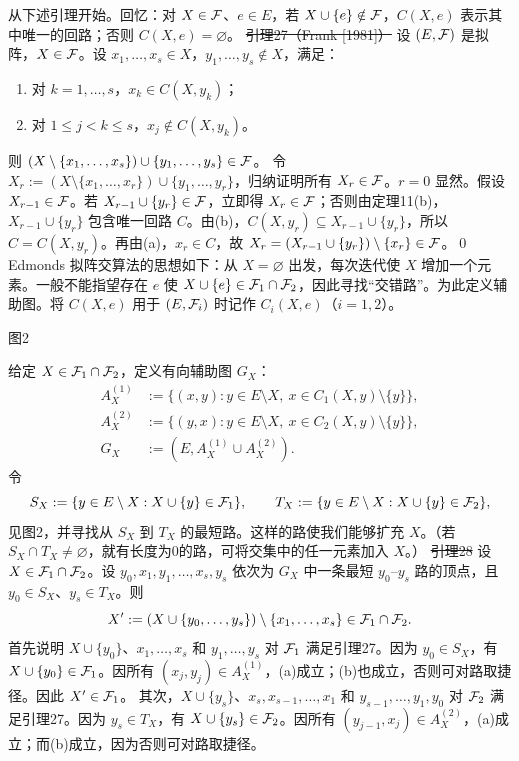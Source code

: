 从下述引理开始。回忆：对 $X\in\mathcal F$、$e\in E$，若 $X\cup\{e\}\notin\mathcal F$，$C(X,e)$ 表示其中唯一的回路；否则 $C(X,e)=\varnothing$。
\st{引理27（Frank [1981]）} 设 $(E,\mathcal F)$ 是拟阵，$X\in\mathcal F$。设 $x_1,\ldots,x_s\in X$，$y_1,\ldots,y_s\notin X$，满足：
\begin{enumerate}[label=(\alph*)]
\item 对 $k=1,\ldots,s$，$x_k\in C(X,y_k)$；
\item 对 $1\le j<k\le s$，$x_j\notin C(X,y_k)$。
\end{enumerate}
则 $(X\setminus\{x_1,\ldots,x_s\})\cup\{y_1,\ldots,y_s\}\in\mathcal F$。
\pr 令 $X_r:=(X\setminus\{x_1,\ldots,x_r\})\cup\{y_1,\ldots,y_r\}$，归纳证明所有 $X_r\in\mathcal F$。$r=0$ 显然。假设 $X_{r-1}\in\mathcal F$。若 $X_{r-1}\cup\{y_r\}\in\mathcal F$，立即得 $X_r\in\mathcal F$；否则由定理11(b)，$X_{r-1}\cup\{y_r\}$ 包含唯一回路 $C$。由(b)，$C(X,y_r)\subseteq X_{r-1}\cup\{y_r\}$，所以 $C=C(X,y_r)$。再由(a)，$x_r\in C$，故 $X_r=(X_{r-1}\cup\{y_r\})\setminus\{x_r\}\in\mathcal F$。\qed
Edmonds 拟阵交算法的思想如下：从 $X=\varnothing$ 出发，每次迭代使 $X$ 增加一个元素。一般不能指望存在 $e$ 使 $X\cup\{e\}\in\mathcal F_1\cap\mathcal F_2$，因此寻找“交错路”。为此定义辅助图。将 $C(X,e)$ 用于 $(E,\mathcal F_i)$ 时记作 $C_i(X,e)$（$i=1,2$）。

\begin{center}
\par\small 图2
\end{center}
给定 $X\in\mathcal F_1\cap\mathcal F_2$，定义有向辅助图 $G_X$：
\begin{align*}
A_X^{(1)}&:=\{(x,y):y\in E\setminus X,\ x\in C_1(X,y)\setminus\{y\}\},\\
A_X^{(2)}&:=\{(y,x):y\in E\setminus X,\ x\in C_2(X,y)\setminus\{y\}\},\\
G_X&:=(E,A_X^{(1)}\cup A_X^{(2)}).
\end{align*}
令
\[S_X:=\{y\in E\setminus X:X\cup\{y\}\in\mathcal F_1\},\qquad
T_X:=\{y\in E\setminus X:X\cup\{y\}\in\mathcal F_2\},\]
见图2，并寻找从 $S_X$ 到 $T_X$ 的最短路。这样的路使我们能够扩充 $X$。（若 $S_X\cap T_X\ne\varnothing$，就有长度为0的路，可将交集中的任一元素加入 $X$。）
\st{引理28} 设 $X\in\mathcal F_1\cap\mathcal F_2$。设 $y_0,x_1,y_1,\ldots,x_s,y_s$ 依次为 $G_X$ 中一条最短 $y_0$--$y_s$ 路的顶点，且 $y_0\in S_X$、$y_s\in T_X$。则
\[X':=(X\cup\{y_0,\ldots,y_s\})\setminus\{x_1,\ldots,x_s\}\in\mathcal F_1\cap\mathcal F_2.\]
\pr 首先说明 $X\cup\{y_0\}$、$x_1,\ldots,x_s$ 和 $y_1,\ldots,y_s$ 对 $\mathcal F_1$ 满足引理27。因为 $y_0\in S_X$，有 $X\cup\{y_0\}\in\mathcal F_1$。因所有 $(x_j,y_j)\in A_X^{(1)}$，(a)成立；(b)也成立，否则可对路取捷径。因此 $X'\in\mathcal F_1$。
其次，$X\cup\{y_s\}$、$x_s,x_{s-1},\ldots,x_1$ 和 $y_{s-1},\ldots,y_1,y_0$ 对 $\mathcal F_2$ 满足引理27。因为 $y_s\in T_X$，有 $X\cup\{y_s\}\in\mathcal F_2$。因所有 $(y_{j-1},x_j)\in A_X^{(2)}$，(a)成立；而(b)成立，因为否则可对路取捷径。

